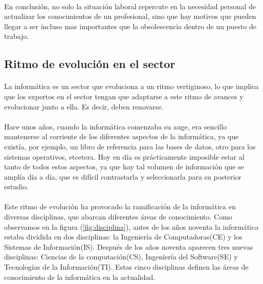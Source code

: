 \documentclass[12pt, a4paper]{report}
\begin{document}
			\paragraph{}
			En conclusión, no solo la situación laboral repercute en la necesidad personal de actualizar los conocimientos de un profesional, sino que hay motivos que pueden llegar a ser incluso mas importantes que la obsolescencia dentro de un puesto de trabajo.

		\subsection{Ritmo de evolución en el sector}
        	\paragraph{}
			La informática es un sector que evoluciona a un ritmo vertiginoso, lo que implica que los expertos en el sector tengan que adaptarse a este ritmo de avances y evolucionar junto a ella. Es decir, deben renovarse.
            
            \paragraph{}
           	Hace unos años, cuando la informática comenzaba su auge, era sencillo mantenerse al corriente de los diferentes aspectos de la informática, ya que existía, por ejemplo, un libro de referencia para las bases de datos, otro para los sistemas operativos, etcetera. Hoy en día es prácticamente imposible estar al tanto de todos estos aspectos, ya que hay tal volumen de información que se amplía día a día, que es difícil contrastarla y seleccionarla para su posterior estudio.
        	
            \paragraph{}
            Este ritmo de evolución ha provocado la ramificación de la informática en diversas disciplinas, que abarcan diferentes áreas de conocimiento. Como observamos en la figura (\ref{fig:disciplina}), antes de los años noventa la informática estaba dividida en dos disciplinas: la Ingeniería de Computadoras(CE) y los Sistemas de Información(IS). Después de los años noventa aparecen tres nuevas disciplinas: Ciencias de la computación(CS), Ingeniería del Software(SE) y Tecnologías de la Información(TI). Estas cinco disciplinas definen las áreas de conocimiento de la informática en la actualidad.
            
\end{document}
